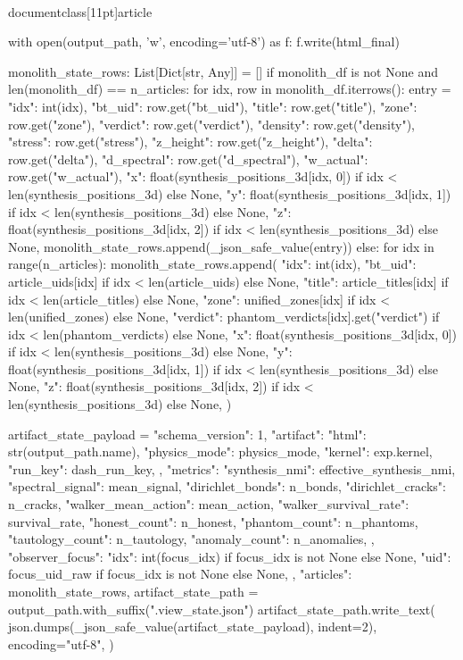 \\documentclass[11pt]{article}
\begin{document}
\begin{CodeBlock}
{{{{{{    with open(output_path, 'w', encoding='utf-8') as f:
        f.write(html_final)

    monolith_state_rows: List[Dict[str, Any]] = []
    if monolith_df is not None and len(monolith_df) == n_articles:
        for idx, row in monolith_df.iterrows():
            entry = {
                "idx": int(idx),
                "bt_uid": row.get("bt_uid"),
                "title": row.get("title"),
                "zone": row.get("zone"),
                "verdict": row.get("verdict"),
                "density": row.get("density"),
                "stress": row.get("stress"),
                "z_height": row.get("z_height"),
                "delta": row.get("delta"),
                "d_spectral": row.get("d_spectral"),
                "w_actual": row.get("w_actual"),
                "x": float(synthesis_positions_3d[idx, 0]) if idx < len(synthesis_positions_3d) else None,
                "y": float(synthesis_positions_3d[idx, 1]) if idx < len(synthesis_positions_3d) else None,
                "z": float(synthesis_positions_3d[idx, 2]) if idx < len(synthesis_positions_3d) else None,
            }
            monolith_state_rows.append(_json_safe_value(entry))
    else:
        for idx in range(n_articles):
            monolith_state_rows.append(
                {
                    "idx": int(idx),
                    "bt_uid": article_uids[idx] if idx < len(article_uids) else None,
                    "title": article_titles[idx] if idx < len(article_titles) else None,
                    "zone": unified_zones[idx] if idx < len(unified_zones) else None,
                    "verdict": phantom_verdicts[idx].get("verdict") if idx < len(phantom_verdicts) else None,
                    "x": float(synthesis_positions_3d[idx, 0]) if idx < len(synthesis_positions_3d) else None,
                    "y": float(synthesis_positions_3d[idx, 1]) if idx < len(synthesis_positions_3d) else None,
                    "z": float(synthesis_positions_3d[idx, 2]) if idx < len(synthesis_positions_3d) else None,
                }
            )

    artifact_state_payload = {
        "schema_version": 1,
        "artifact": {
            "html": str(output_path.name),
            "physics_mode": physics_mode,
            "kernel": exp.kernel,
            "run_key": dash_run_key,
        },
        "metrics": {
            "synthesis_nmi": effective_synthesis_nmi,
            "spectral_signal": mean_signal,
            "dirichlet_bonds": n_bonds,
            "dirichlet_cracks": n_cracks,
            "walker_mean_action": mean_action,
            "walker_survival_rate": survival_rate,
            "honest_count": n_honest,
            "phantom_count": n_phantoms,
            "tautology_count": n_tautology,
            "anomaly_count": n_anomalies,
        },
        "observer_focus": {
            "idx": int(focus_idx) if focus_idx is not None else None,
            "uid": focus_uid_raw if focus_idx is not None else None,
        },
        "articles": monolith_state_rows,
    }
    artifact_state_path = output_path.with_suffix(".view_state.json")
    artifact_state_path.write_text(
        json.dumps(_json_safe_value(artifact_state_payload), indent=2),
        encoding="utf-8",
    )

}}}}}}
\end{CodeBlock}
\end{document}
